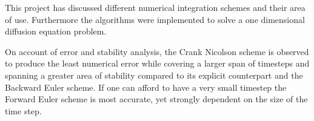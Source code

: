 This project has discussed different numerical integration schemes
and their area of use. Furthermore the algorithms were implemented
to solve a one dimensional diffusion equation problem.

On account of error and stability analysis, the Crank Nicolson
scheme is observed to produce the least numerical error while
covering a larger span of timesteps and spanning a greater area of
stability compared to its explicit counterpart and the Backward
Euler scheme. If one can afford to have a very small timestep the
Forward Euler scheme is most accurate, yet strongly dependent on
the size of the time step.
